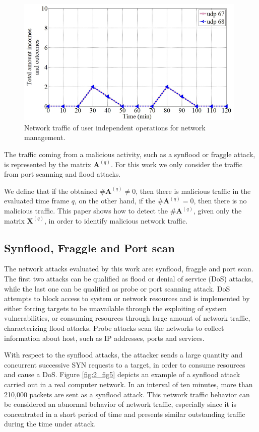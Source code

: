 \begin{figure}[h!]
     \centering 
     \includegraphics[width=11cm]{figures/fig04.png}
     \caption{Network traffic of user independent operations for network management.}
     \label{fig:2_fig4}
\end{figure}

The traffic coming from a malicious activity, such as a synflood or fraggle attack, is represented by the matrix $\boldsymbol{A}^{(q)}$. For this work we only consider the traffic from port scanning and flood attacks.

We define that if the obtained $\#\boldsymbol{A}^{(q)} ≠ 0$, then there is malicious traffic in the evaluated time frame $q$, on the other hand, if the $\#\boldsymbol{A}^{(q)} = 0$, then there is no malicious traffic. This paper shows how to detect the $\#\boldsymbol{A}^{(q)}$, given only the matrix $\boldsymbol{X}^{(q)}$, in order to identify malicious network traffic.

\subsection{Synflood, Fraggle and Port scan}
\label{sec:2_SynfloodFraggleandPortscan}

The network attacks evaluated by this work are: synflood, fraggle and port scan. The first two attacks can be qualified as flood or denial of service (DoS) attacks, while the last one can be qualified as probe or port scanning attack. DoS attempts to block access to system or network resources and is implemented by either forcing targets to be unavailable through the exploiting of system vulnerabilities, or consuming resources through large amount of network traffic, characterizing flood attacks. Probe attacks scan the networks to collect information about host, such as IP addresses, ports and services.


With respect to the synflood attacks, the attacker sends a large quantity and concurrent successive SYN requests to a target, in order to consume resources and cause a DoS. Figure \ref{fig:2_fig5} depicts an example of a synflood attack carried out in a real computer network. In an interval of ten minutes, more than 210,000 packets are sent as a synflood attack. This network traffic behavior can be considered an abnormal behavior of network traffic, especially since it is concentrated in a short period of time and presents similar outstanding traffic during the time under attack.

